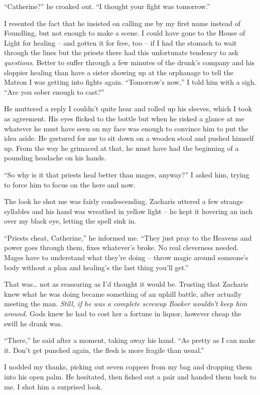 \documentclass[12pt, openany]{book}
\begin{document}
“Catherine?” he croaked out. “I thought your fight was tomorrow.”

I resented the fact that he insisted on calling me by my first name instead of Foundling, but not enough to make a scene. I could have gone to the House of Light for healing – and gotten it for free, too – if I had the stomach to wait through the lines but the priests there had this unfortunate tendency to ask \textit{questions}. Better to suffer through a few minutes of the drunk’s company and his sloppier healing than have a sister showing up at the orphanage to tell the Matron I was getting into fights again. “Tomorrow’s now,” I told him with a sigh. “Are you sober enough to cast?”

He muttered a reply I couldn’t quite hear and rolled up his sleeves, which I took as agreement. His eyes flicked to the bottle but when he risked a glance at me whatever he must have seen on my face was enough to convince him to put the idea aside. He gestured for me to sit down on a wooden stool and pushed himself up. From the way he grimaced at that, he must have had the beginning of a pounding headache on his hands.

“So why is it that priests heal better than mages, anyway?” I asked him, trying to force him to focus on the here and now.

The look he shot me was fairly condescending. Zacharis uttered a few strange syllables and his hand was wreathed in yellow light – he kept it hovering an inch over my black eye, letting the spell sink in.

“Priests cheat, Catherine,” he informed me. “They just pray to the Heavens and power goes through them, fixes whatever’s broke. No real cleverness needed. Mages have to understand what they’re doing – throw magic around someone’s body without a plan and healing’s the last thing you’ll get.”

That was… not as reassuring as I’d thought it would be. Trusting that Zacharis knew what he was doing became something of an uphill battle, after actually meeting the man. \textit{Still, if he was a complete screwup Booker wouldn’t keep him around.} Gods knew he had to cost her a fortune in liquor, however cheap the swill he drank was. 

“There,” he said after a moment, taking away his hand. “As pretty as I can make it. Don’t get punched again, the flesh is more fragile than usual.”

I nodded my thanks, picking out seven coppers from my bag and dropping them into his open palm. He hesitated, then fished out a pair and handed them back to me. I shot him a surprised look.
\end{document}
